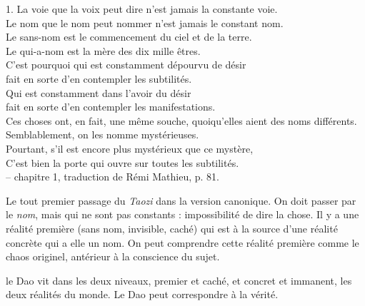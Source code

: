 \begin{singlequote}
    1.	La voie que la voix peut dire n’est jamais la constante voie. \\
Le nom que le nom peut nommer n’est jamais le constant nom. \\ Le sans-nom est le commencement du ciel et de la terre.\\
Le qui-a-nom est la mère des dix mille êtres.\\
C’est pourquoi qui est constamment dépourvu de désir  \\fait en sorte d’en contempler les subtilités.\\
Qui est constamment dans l’avoir du désir  \\fait en sorte d’en contempler les manifestations.\\
Ces choses ont, en fait, une même souche, quoiqu’elles aient des noms différents.  \\Semblablement, on les nomme mystérieuses.\\
Pourtant, s’il est encore plus mystérieux que ce mystère,  \\C’est bien la porte qui ouvre sur toutes les subtilités.\\
-- chapitre 1, traduction de Rémi Mathieu, p. 81.
\end{singlequote}

Le tout premier passage du \textit{Taozi} dans la version canonique. 
On doit passer par le \textit{nom}, mais qui ne sont pas constants : impossibilité de dire la chose.
Il y a une réalité première (sans nom, invisible, caché) qui est à la source d'une réalité concrète qui a elle un nom.
On peut comprendre cette réalité première comme le chaos originel, antérieur à la conscience du sujet. 

\begin{Prop}[Le monde]
    le Dao vit dans les deux niveaux, premier et caché, et concret et immanent, les deux réalités du monde. 
    Le Dao peut correspondre à  la vérité. 
\end{Prop}


